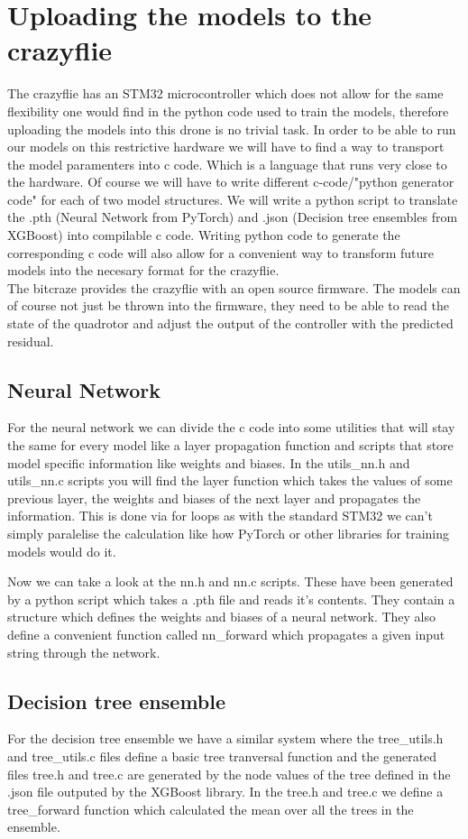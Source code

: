 \documentclass[11pt]{article}
\begin{document}
\section{Uploading the models to the crazyflie}
The crazyflie has an STM32 microcontroller which does not allow for the same flexibility one would find in the python code used to train the models, therefore uploading the models into this drone is no trivial task.
In order to be able to run our models on this restrictive hardware we will have to find a way to transport the model paramenters into c code. Which is a language that runs very close to the hardware. Of course we will have to write different c-code/"python generator code" for each of two model structures.
We will write a python script to translate the .pth (Neural Network from PyTorch) and .json (Decision tree ensembles from XGBoost) into compilable c code.
Writing python code to generate the corresponding c code will also allow for a convenient way to transform future models into the necesary format for the crazyflie.
\\
The bitcraze provides the crazyflie with an open source firmware. The models can of course not just be thrown into the firmware, they need to be able to read the state of the quadrotor and adjust the output of the controller with the predicted residual.

\subsection{Neural Network}
For the neural network we can divide the c code into some utilities that will stay the same for every model like a layer propagation function and scripts that store model specific information like weights and biases. In the utils\_nn.h and utils\_nn.c scripts you will find the layer function which takes the values of some previous layer, the weights and biases of the next layer and propagates the information. This is done via for loops as with the standard STM32 we can't simply paralelise the calculation like how PyTorch or other libraries for training models would do it.

Now we can take a look at the nn.h and nn.c scripts. These have been generated by a python script which takes a .pth file and reads it's contents. They contain a structure which defines the weights and biases of a neural network. They also define a convenient function called nn\_forward which propagates a given input string through the network.

\subsection{Decision tree ensemble}
For the decision tree ensemble we have a similar system where the tree\_utils.h and tree\_utils.c files define a basic tree tranversal function and the generated files tree.h and tree.c are generated by the node values of the tree defined in the .json file outputed by the XGBoost library. In the tree.h and tree.c we define a tree\_forward function which calculated the mean over all the trees in the ensemble.
\end{document}
